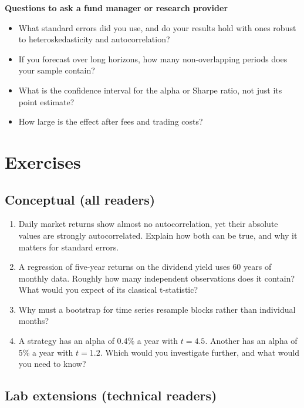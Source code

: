 \textbf{Questions to ask a fund manager or research provider}

\begin{itemize}
  \item What standard errors did you use, and do your results hold with ones robust to heteroskedasticity and autocorrelation?
  \item If you forecast over long horizons, how many non-overlapping periods does your sample contain?
  \item What is the confidence interval for the alpha or Sharpe ratio, not just its point estimate?
  \item How large is the effect after fees and trading costs?
\end{itemize}

\section*{Exercises}

\subsection*{Conceptual (all readers)}

\begin{enumerate}
  \item Daily market returns show almost no autocorrelation, yet their absolute values are strongly autocorrelated. Explain how both can be true, and why it matters for standard errors.
  \item A regression of five-year returns on the dividend yield uses 60 years of monthly data. Roughly how many independent observations does it contain? What would you expect of its classical t-statistic?
  \item Why must a bootstrap for time series resample blocks rather than individual months?
  \item A strategy has an alpha of 0.4\% a year with $t = 4.5$. Another has an alpha of 5\% a year with $t = 1.2$. Which would you investigate further, and what would you need to know?
\end{enumerate}

\subsection*{Lab extensions (technical readers)}

